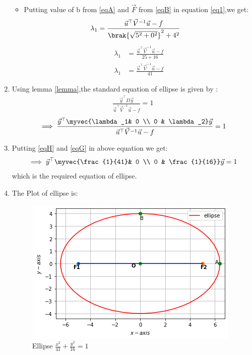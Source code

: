 \documentclass[journal,12pt,twocolumn]{IEEEtran}
\begin{document}
\begin{enumerate}
\begin{itemize}
\item Putting value of b from \eqref{eqA} and $\vec{F}$ from \eqref{eqB} in equation \eqref{eq1},we get:
\begin{align}
   \lambda_1&= \frac{\vec{u}^{\top}\vec{V}^{-1}\vec{u}-f}{\brak{\sqrt{5^2+0^2}}^2+4^2}
    \end{align}
    \begin{align}
     \lambda_1&= \frac{\vec{u}^{\top}\vec{V}^{-1}\vec{u}-f}{25+16}
     \\
      \lambda_1&= \frac{\vec{u}^{\top}\vec{V}^{-1}\vec{u}-f}{41}\label{eqG}
\end{align}
\end{itemize}
\item Using lemma \eqref{lemma},the standard equation of ellipse is given by :
\begin{align}
\frac{\vec{y}^{\top}D\vec{y}}{\vec{u}^{\top}\vec{V}^{-1}\vec{u}-f}=1
\end{align}
\begin{align}
\implies \frac{\vec{y}^{\top}\myvec{\lambda_1& 0 \\ 0 & \lambda_2}\vec{y} }{\vec{u}^{\top}\vec{V}^{-1}\vec{u}-f}=1
\end{align}
\item Putting \eqref{eqH} and \eqref{eqG} in above equation we get:
\begin{align}
\implies \vec{y}^{\top}\myvec{\frac{1}{41}& 0 \\ 0 & \frac{1}{16}}\vec{y}=1
\end{align}
which is the required equation of ellipse.
\item The Plot of ellipse is:
\begin{figure}[!ht]
    \centering
    \includegraphics[width=\columnwidth]{ellipse1.png}
    \caption{Ellipse $\frac{x^2}{41} + \frac{y^2}{16} = 1$}
    \label{fig:ellipse}
\end{figure} 
\end{enumerate}
\end{document}
